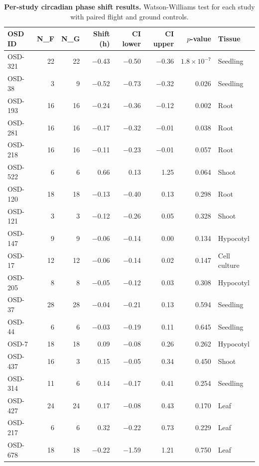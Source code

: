 \documentclass[11pt,a4paper]{article}
\begin{document}
\begin{table}[htbp]
\centering
\caption{\textbf{Per-study circadian phase shift results.} Watson-Williams test for each study with paired flight and ground controls.}
\small
\begin{tabular}{lrrrrrrl}
\toprule
\textbf{OSD ID} & \textbf{N\_F} & \textbf{N\_G} & \textbf{Shift (h)} & \textbf{CI lower} & \textbf{CI upper} & \textbf{$p$-value} & \textbf{Tissue} \\
\midrule
OSD-321 & 22 & 22 & $-$0.43 & $-$0.50 & $-$0.36 & $1.8 \times 10^{-7}$ & Seedling \\
OSD-38 & 3 & 9 & $-$0.52 & $-$0.73 & $-$0.32 & 0.026 & Seedling \\
OSD-193 & 16 & 16 & $-$0.24 & $-$0.36 & $-$0.12 & 0.002 & Root \\
OSD-281 & 16 & 16 & $-$0.17 & $-$0.32 & $-$0.01 & 0.038 & Root \\
OSD-218 & 16 & 16 & $-$0.11 & $-$0.23 & $-$0.01 & 0.057 & Root \\
OSD-522 & 6 & 6 & 0.66 & 0.13 & 1.25 & 0.064 & Shoot \\
OSD-120 & 18 & 18 & $-$0.13 & $-$0.40 & 0.13 & 0.298 & Root \\
OSD-121 & 3 & 3 & $-$0.12 & $-$0.26 & 0.05 & 0.328 & Shoot \\
OSD-147 & 9 & 9 & $-$0.06 & $-$0.14 & 0.00 & 0.134 & Hypocotyl \\
OSD-17 & 12 & 12 & $-$0.06 & $-$0.14 & 0.02 & 0.147 & Cell culture \\
OSD-205 & 8 & 8 & $-$0.05 & $-$0.12 & 0.03 & 0.308 & Hypocotyl \\
OSD-37 & 28 & 28 & $-$0.04 & $-$0.21 & 0.13 & 0.594 & Seedling \\
OSD-44 & 6 & 6 & $-$0.03 & $-$0.19 & 0.11 & 0.645 & Seedling \\
OSD-7 & 18 & 18 & 0.09 & $-$0.08 & 0.26 & 0.262 & Hypocotyl \\
OSD-437 & 16 & 3 & 0.15 & $-$0.05 & 0.34 & 0.450 & Shoot \\
OSD-314 & 11 & 6 & 0.14 & $-$0.17 & 0.41 & 0.254 & Seedling \\
OSD-427 & 24 & 24 & 0.17 & $-$0.08 & 0.43 & 0.170 & Leaf \\
OSD-217 & 6 & 6 & 0.32 & $-$0.22 & 0.73 & 0.229 & Leaf \\
OSD-678 & 18 & 18 & $-$0.22 & $-$1.59 & 1.21 & 0.750 & Leaf \\
\bottomrule
\end{tabular}
\end{table}
\end{document}
